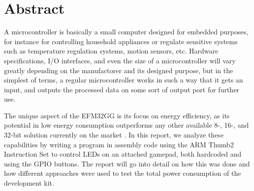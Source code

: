 \section{Abstract}

	A microcontroller is basically a small computer designed for embedded purposes, for instance for controlling household appliances or regulate sensitive systems such as temperature regulation systems, motion sensors, etc. Hardware specifications, I/O interfaces, and even the size of a microcontroller will vary greatly depending on the manufactorer and its designed purpose, but in the simplest of terms, a regular microcontroller works in such a way that it gets an input, and outputs the processed data on some sort of output port for further use.
	
	The unique aspect of the EFM32GG is its focus on energy efficiency, as its potential in low energy consumption outperforms any other available 8-, 16-, and 32-bit solution currently on the market \cite{EFM32GG-rm}. In this report, we analyze these capabilities by writing a program in assembly code using the ARM Thumb2 Instruction Set to control LEDs on an attached gamepad, both hardcoded and using the GPIO buttons. The report will go into detail on how this was done and how different approaches were used to test the total power consumption of the development kit.
	
	